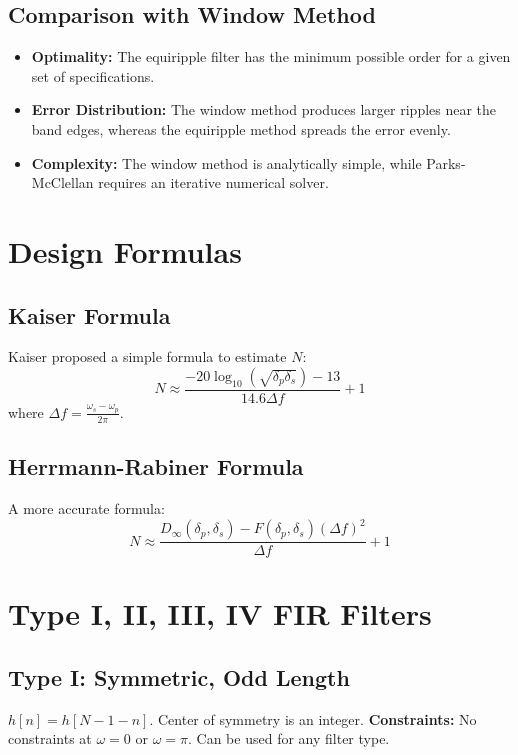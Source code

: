 \documentclass[11pt,a4paper]{article}
\begin{document}
\subsection{Comparison with Window Method}
\begin{itemize}
    \item \textbf{Optimality:} The equiripple filter has the minimum possible order for a given set of specifications.
    \item \textbf{Error Distribution:} The window method produces larger ripples near the band edges, whereas the equiripple method spreads the error evenly.
    \item \textbf{Complexity:} The window method is analytically simple, while Parks-McClellan requires an iterative numerical solver.
\end{itemize}

\section{Design Formulas}

\subsection{Kaiser Formula}
Kaiser proposed a simple formula to estimate $N$:
\begin{equation}
N \approx \frac{-20 \log_{10}(\sqrt{\delta_p \delta_s}) - 13}{14.6 \Delta f} + 1
\end{equation}
where $\Delta f = \frac{\omega_s - \omega_p}{2\pi}$.

\subsection{Herrmann-Rabiner Formula}
A more accurate formula:
\begin{equation}
N \approx \frac{D_{\infty}(\delta_p, \delta_s) - F(\delta_p, \delta_s) (\Delta f)^2}{\Delta f} + 1
\end{equation}

\section{Type I, II, III, IV FIR Filters}

\subsection{Type I: Symmetric, Odd Length}
$h[n] = h[N-1-n]$. Center of symmetry is an integer. \textbf{Constraints:} No constraints at $\omega = 0$ or $\omega = \pi$. Can be used for any filter type.
\end{document}

